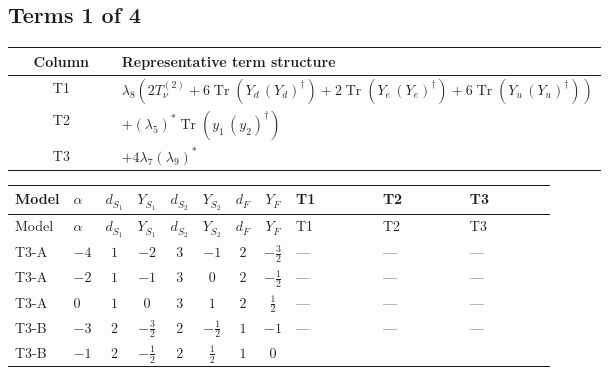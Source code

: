\documentclass[8pt]{article}
\begin{document}
\begin{landscape}
\subsection*{Terms 1 of 4}
\begin{center}
\begin{tabular}{@{}c >{\raggedright\arraybackslash}p{0.82\linewidth}@{}}
\toprule
Column & Representative term structure \\
\midrule
T1 & \(\displaystyle {\lambda_{8}} (2 T_{\nu}^{(2)}+6 \operatorname{Tr}\!\left({Y_d}\,\left({Y_d}\right)^{\dagger}\right)+2 \operatorname{Tr}\!\left({Y_e}\,\left({Y_e}\right)^{\dagger}\right)+6 \operatorname{Tr}\!\left({Y_u}\,\left({Y_u}\right)^{\dagger}\right))\) \\
\midrule
T2 & \(\displaystyle +\left({\lambda_5}\right)^{*} \operatorname{Tr}\!\left({y_1}\,\left({y_2}\right)^{\dagger}\right)\) \\
\midrule
T3 & \(\displaystyle +4 {\lambda_{7}} \left({\lambda_{9}}\right)^{*}\) \\
\midrule
\bottomrule
\end{tabular}
\end{center}
\smallskip
\tiny
\begin{longtable}{@{}llcccccc >{\raggedright\arraybackslash}p{0.21\linewidth} >{\raggedright\arraybackslash}p{0.21\linewidth} >{\raggedright\arraybackslash}p{0.21\linewidth}@{}}
\toprule
Model & $\alpha$ & $d_{S_1}$ & $Y_{S_1}$ & $d_{S_2}$ & $Y_{S_2}$ & $d_F$ & $Y_F$ & T1 & T2 & T3 \\
\midrule
\endfirsthead
\toprule
Model & $\alpha$ & $d_{S_1}$ & $Y_{S_1}$ & $d_{S_2}$ & $Y_{S_2}$ & $d_F$ & $Y_F$ & T1 & T2 & T3 \\
\midrule
\endhead
T3-A & $-4$ & $1$ & $-2$ & $3$ & $-1$ & $2$ & $-\frac{3}{2}$ & --- & --- & --- \\
\midrule
T3-A & $-2$ & $1$ & $-1$ & $3$ & $0$ & $2$ & $-\frac{1}{2}$ & --- & --- & --- \\
\midrule
T3-A & $0$ & $1$ & $0$ & $3$ & $1$ & $2$ & $\frac{1}{2}$ & --- & --- & --- \\
\midrule
T3-B & $-3$ & $2$ & $-\frac{3}{2}$ & $2$ & $-\frac{1}{2}$ & $1$ & $-1$ & --- & --- & --- \\
\midrule
T3-B & $-1$ & $2$ & $-\frac{1}{2}$ & $2$ & $\frac{1}{2}$ & $1$ & $0$ & \scriptsize\adjustbox{max width=\linewidth}{$\begin{gathered} {\lambda_{8}} (2 T_{\nu}^{(2)}+6 \operatorname{Tr}\!\left({Y_d}\,\left({Y_d}\right)^{\dagger}\right)+2 \operatorname{Tr}\!\left({Y_e}\,\left({Y_e}\right)^{\dagger}\right)+6 \operatorname{Tr}\!\left({Y_u}\,\left({Y_u}\right)^{\dagger}\right))\end{gathered}$} & \scriptsize\adjustbox{max width=\linewidth}{$\begin{gathered} +\left({\lambda_5}\right)^{*} \operatorname{Tr}\!\left({y_1}\,\left({y_2}\right)^{\dagger}\right)\end{gathered}$} & \scriptsize\adjustbox{max width=\linewidth}{$\begin{gathered} +4 {\lambda_{7}} \left({\lambda_{9}}\right)^{*}\end{gathered}$} \\

\end{longtable}
\end{landscape}
\end{document}

